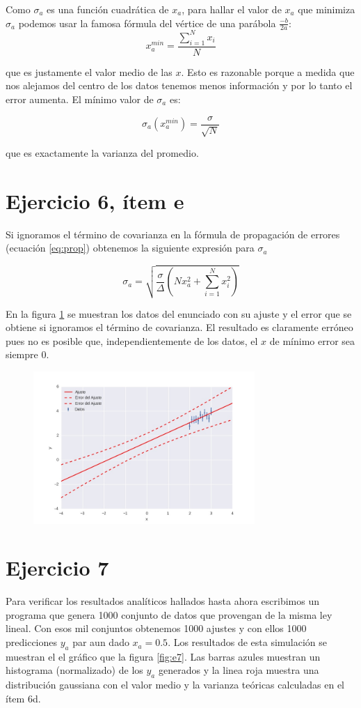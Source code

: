 Como $\sigma_a$ es una función cuadrática de $x_a$, para hallar el valor de $x_a$ que minimiza $\sigma_a$ podemos usar la famosa fórmula del vértice de una parábola $\frac{-b}{2a}$:
$$
x_a^{min} = \frac{\sum_{i=1}^N x_i}{N}
$$

que es justamente el valor medio de las $x$. 
Esto es razonable porque a medida que nos alejamos del centro de los datos tenemos menos información y por lo tanto el error aumenta. 
El mínimo valor de $\sigma_a$ es:

$$
\sigma_a(x_a^{min}) = \frac{\sigma}{\sqrt{N}}
$$

que es exactamente la varianza del promedio.

\section*{Ejercicio 6, ítem e}
Si ignoramos el término de covarianza en la fórmula de propagación de errores (ecuación \ref{eq:prop}) obtenemos la siguiente expresión para $\sigma_a$ 

$$
\sigma_a = \sqrt{\frac{\sigma}{\Delta}(N x_a^2 + \sum_{i=1}^N x_i^2)}
$$

En la figura \ref{fig:e6e} se muestran los datos del enunciado con su ajuste y el error que se obtiene si ignoramos el término de covarianza. 
El resultado es claramente erróneo pues no es posible que, independientemente de los datos, el $x$ de mínimo error sea siempre $0$.

\begin{figure}
\centering
\includegraphics[width=0.75\textwidth]{ej6e.jpg}
\caption[]{}
\label{fig:e6e}
\end{figure}

\section*{Ejercicio 7}
Para verificar los resultados analíticos hallados hasta ahora escribimos un programa que genera 1000 conjunto de datos que provengan de la misma ley lineal.
Con esos mil conjuntos obtenemos 1000 ajustes y con ellos 1000 predicciones $y_a$ par aun dado $x_a=0.5$.
Los resultados de esta simulación se muestran el el gráfico que la figura \ref{fig:e7}.
Las barras azules muestran un histograma (normalizado) de los $y_a$ generados y la linea roja muestra una distribución gaussiana con el valor medio y la varianza teóricas calculadas en el ítem 6d. 

